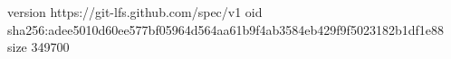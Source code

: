 version https://git-lfs.github.com/spec/v1
oid sha256:adee5010d60ee577bf05964d564aa61b9f4ab3584eb429f9f5023182b1df1e88
size 349700
